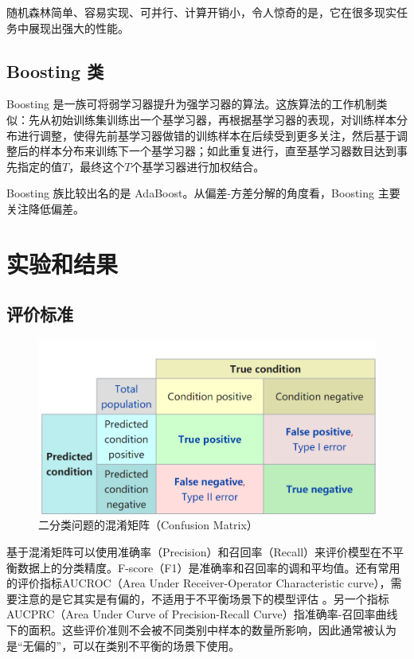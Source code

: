 \documentclass[a4paper]{article}
\begin{document}
随机森林简单、容易实现、可并行、计算开销小，令人惊奇的是，它在很多现实任务中展现出强大的性能。

\subsection{Boosting 类}

Boosting 是一族可将弱学习器提升为强学习器的算法。这族算法的工作机制类似：先从初始训练集训练出一个基学习器，再根据基学习器的表现，对训练样本分布进行调整，使得先前基学习器做错的训练样本在后续受到更多关注，然后基于调整后的样本分布来训练下一个基学习器；如此重复进行，直至基学习器数目达到事先指定的值$T$，最终这个$T$个基学习器进行加权结合。

Boosting 族比较出名的是 AdaBoost。从偏差-方差分解的角度看，Boosting 主要关注降低偏差。



\newpage
\section{实验和结果}

\subsection{评价标准}

\begin{figure}[!h]
    \centering
    \includegraphics[width=0.7\linewidth]{fig2.png}
    \caption{二分类问题的混淆矩阵（Confusion Matrix）}
    \label{fig:conf_mat}
\end{figure}

基于混淆矩阵可以使用准确率（Precision）和召回率（Recall）来评价模型在不平衡数据上的分类精度。F-score（F1）是准确率和召回率的调和平均值。还有常用的评价指标AUCROC（Area Under Receiver-Operator Characteristic curve），需要注意的是它其实是有偏的，不适用于不平衡场景下的模型评估 \cite{davis2006relationship}。另一个指标 AUCPRC（Area Under Curve of Precision-Recall Curve）\cite{davis2006relationship}指准确率-召回率曲线下的面积。这些评价准则不会被不同类别中样本的数量所影响，因此通常被认为是“无偏的”，可以在类别不平衡的场景下使用。
\end{document}
